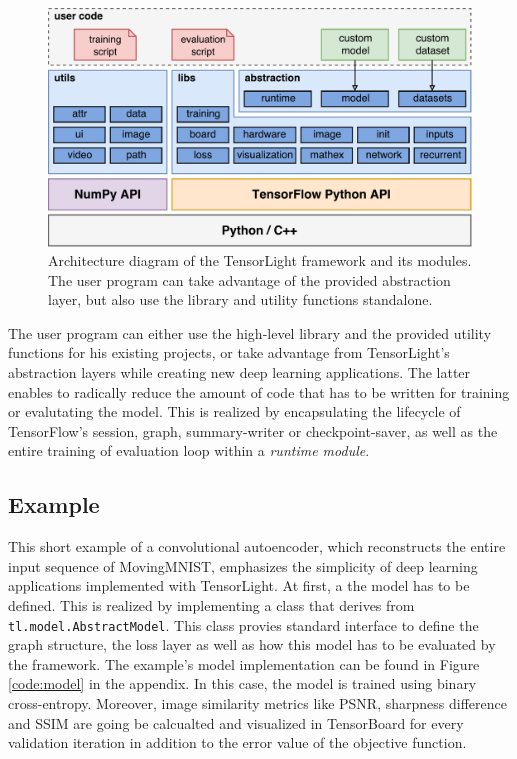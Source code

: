 \begin{figure}[htpb]
	\centering
	\includegraphics[width=0.8\linewidth]{figures/tensorlight_v3.pdf} 
	\caption[TensorLight Framework Architecture]{Architecture diagram of the TensorLight framework and its modules. The user program can take advantage of the provided abstraction layer, but also use the library and utility functions standalone.} \label{fig:tl_arch}
\end{figure}

The user program can either use the high-level library and the provided utility functions for his existing projects, or take advantage from TensorLight's abstraction layers while creating new deep learning applications. The latter enables to radically reduce the amount of code that has to be written for training or evalutating the model. This is realized by encapsulating the lifecycle of TensorFlow's session, graph, summary-writer or checkpoint-saver, as well as the entire training of evaluation loop within a \textit{runtime module}.


\subsection{Example}

This short example of a convolutional autoencoder, which reconstructs the entire input sequence of MovingMNIST, emphasizes the simplicity of deep learning applications implemented with TensorLight. At first, a the model has to be defined. This is realized by implementing a class that derives from \texttt{tl.model.AbstractModel}. This class provies standard interface to define the graph structure, the loss layer as well as how this model has to be evaluated by the framework. The example's model implementation can be found in Figure \ref{code:model} in the appendix. In this case, the model is trained using binary cross-entropy. Moreover, image similarity metrics like PSNR, sharpness difference and SSIM are going be calcualted and visualized in TensorBoard for every validation iteration in addition to the error value of the objective function.

